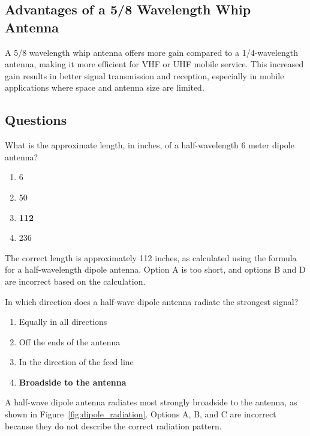 \subsection*{Advantages of a 5/8 Wavelength Whip Antenna}
A 5/8 wavelength whip antenna offers more gain compared to a 1/4-wavelength antenna, making it more efficient for VHF or UHF mobile service. This increased gain results in better signal transmission and reception, especially in mobile applications where space and antenna size are limited.

\subsection*{Questions}
\begin{tcolorbox}[colback=gray!10!white,colframe=black!75!black,title={T9A09}]
What is the approximate length, in inches, of a half-wavelength 6 meter dipole antenna?
\begin{enumerate}[label=\Alph*),noitemsep]
    \item 6
    \item 50
    \item \textbf{112}
    \item 236
\end{enumerate}
\end{tcolorbox}
The correct length is approximately 112 inches, as calculated using the formula for a half-wavelength dipole antenna. Option A is too short, and options B and D are incorrect based on the calculation.


\begin{tcolorbox}[colback=gray!10!white,colframe=black!75!black,title={T9A10}]
In which direction does a half-wave dipole antenna radiate the strongest signal?
\begin{enumerate}[label=\Alph*),noitemsep]
    \item Equally in all directions
    \item Off the ends of the antenna
    \item In the direction of the feed line
    \item \textbf{Broadside to the antenna}
\end{enumerate}
\end{tcolorbox}
A half-wave dipole antenna radiates most strongly broadside to the antenna, as shown in Figure~\ref{fig:dipole_radiation}. Options A, B, and C are incorrect because they do not describe the correct radiation pattern.

